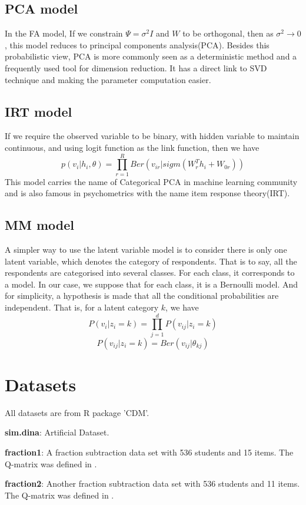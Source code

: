 \documentclass[11pt]{article}
\begin{document}
\subsection{PCA model}
In the FA model, If we constrain $\Psi=\sigma^2I$ and $W$ to be orthogonal, then as $\sigma^2\rightarrow0$, this model reduces to principal components analysis(PCA)\cite{murphy2012machine}. Besides this probabilistic view, PCA is more commonly seen as a deterministic method and a frequently used tool for dimension reduction. It has a direct link to SVD technique and making the parameter computation easier.

\subsection{IRT model}
If we require the observed variable to be binary, with hidden variable to maintain continuous, and using logit function as the link function, then we have 
$$p(v_i|h_i,\theta)=\prod_{r=1}^{R}Ber(v_{ir}|sigm(W_r^Th_i+W_{0r}))$$
This model carries the name of Categorical PCA\cite{murphy2012machine} in machine learning community and is also famous in psychometrics with the name item response theory(IRT).

\subsection{MM model}
A simpler way to use the latent variable model is to consider there is only one latent variable, which denotes the category of respondents. That is to say, all the respondents are categorised into several classes. For each class, it corresponds to a model. In our case, we suppose that for each class, it is a Bernoulli model. And for simplicity, a hypothesis is made that all the conditional probabilities are independent. That is, for a latent category $k$, we have 
$$ P(v_i|z_i=k)=\prod_{j=1}^{d}P(v_{ij}|z_i=k)$$
$$ P(v_{ij}|z_i=k) = Ber(v_{ij}|\theta_{kj})$$
\section{Datasets}
All datasets are from R package 'CDM'\cite{CDM}.

\textbf{sim.dina}: Artificial Dataset.

\textbf{fraction1}: A fraction subtraction data set with 536 students and 15 items. The Q-matrix was defined in \cite{de2009dina}.

\textbf{fraction2}: Another fraction subtraction data set with 536 students and 11 items. The Q-matrix was defined in \cite{de2009dina}.
\end{document}
